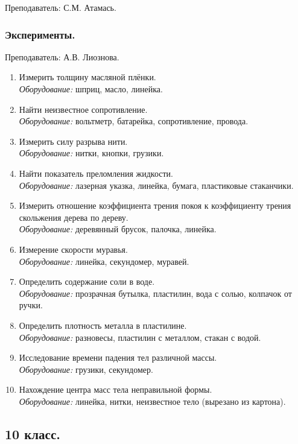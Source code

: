 \documentclass[12pt,a4paper,oneside]{scrartcl}
\begin{document}
\textsf{Преподаватель: С.М. Атамась.}

\subsubsection{Эксперименты.}
\label{sec:daily_9_exp}

\textsf{Преподаватель: А.В. Лиознова.}

\begin{enumerate}
\item Измерить толщину масляной плёнки. \\ \textit{Оборудование:} шприц, масло, линейка.
\item Найти неизвестное сопротивление. \\ \textit{Оборудование:} вольтметр, батарейка, сопротивление, провода.
\item Измерить силу разрыва нити. \\ \textit{Оборудование:} нитки, кнопки, грузики.
\item Найти показатель преломления жидкости. \\ \textit{Оборудование:} лазерная указка, линейка, бумага, пластиковые стаканчики.
\item Измерить отношение коэффициента трения покоя к коэффициенту
  трения скольжения дерева по дереву. \\ \textit{Оборудование:} деревянный брусок, палочка, линейка.
\item Измерение скорости муравья.  \\ \textit{Оборудование:} линейка,
  секундомер, муравей.
\item Определить содержание соли в воде. \\ \textit{Оборудование:}
  прозрачная бутылка, пластилин, вода с солью, колпачок от ручки.
\item Определить плотность металла в пластилине. \\
  \textit{Оборудование:} разновесы, пластилин с металлом, стакан с
  водой.
\item Исследование времени падения тел различной массы. \\
  \textit{Оборудование:} грузики, секундомер.
\item Нахождение центра масс тела неправильной формы. \\
  \textit{Оборудование:} линейка, нитки, неизвестное тело (вырезано из
  картона).
\end{enumerate}

\subsection{10 класс.}
\label{sec:daily_10}
\end{document}
